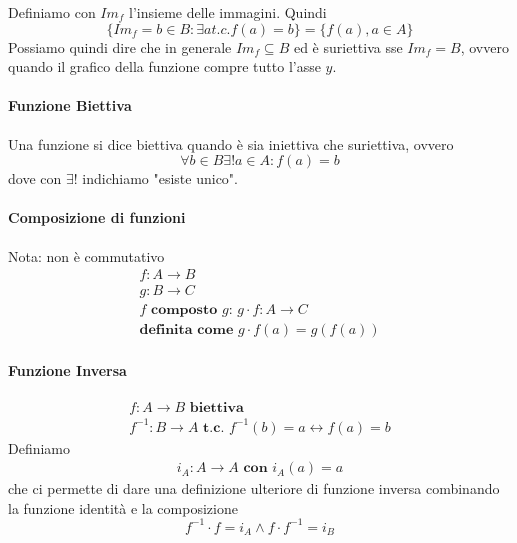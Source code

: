 \documentclass{article}
\begin{document}
Definiamo con $Im_f$ l'insieme delle immagini. Quindi 
\begin{displaymath}\label{insieme_immagine}
    \{Im_f=b \in B: \exists a t.c. f(a)=b\}=\{f(a), a \in A\}
\end{displaymath}Possiamo quindi dire che in generale $Im_f \subseteq B$ ed è suriettiva sse $Im_f = B$, ovvero quando il grafico della funzione compre tutto l'asse $y$.

\paragraph{Funzione Biettiva}
Una funzione si dice biettiva quando è sia iniettiva che suriettiva, ovvero
\begin{displaymath}\label{biettiva}
    \forall b \in B \exists ! a \in A: f(a)=b
\end{displaymath}
dove con $\exists!$ indichiamo "esiste unico".

\paragraph{Composizione di funzioni}
Nota: non è commutativo
\begin{displaymath}\label{composizione}
    \begin{split}
        f:A \rightarrow B\\
        g:B \rightarrow C\\
        \textbf{$f$ composto $g$: } g \cdot f: A \rightarrow C\\
        \textbf{definita come } g \cdot f(a) = g(f(a))
    \end{split}
\end{displaymath}

\paragraph{Funzione Inversa}
\begin{displaymath}\label{inversa}
    \begin{split}
        f:A \rightarrow B \textbf{ biettiva}\\
        f^{-1}:B \rightarrow A \textbf{ t.c. } f^{-1}(b) = a \leftrightarrow f(a)=b
    \end{split}
\end{displaymath}
Definiamo 
\begin{displaymath}
    \begin{split}
        i_A: A \rightarrow A \textbf{ con } i_A(a) = a
    \end{split}
\end{displaymath}
che ci permette di dare una definizione ulteriore di funzione inversa combinando la funzione identità e la composizione
\begin{displaymath}
        f^{-1} \cdot f=i_A \wedge f \cdot f^{-1}=i_B
\end{displaymath}
\end{document}
